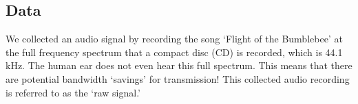 \subsection{Data}

We collected an audio signal by recording the song
`Flight of the Bumblebee' at the full frequency spectrum that a compact disc (CD) is recorded, which is 44.1 kHz. The human ear does not even hear this full spectrum.  This means that there are potential bandwidth `savings'
for transmission! This collected audio recording is referred to
as the `raw signal.'
